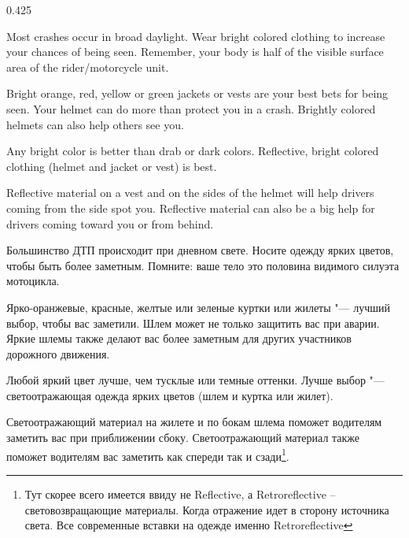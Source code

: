 \begin{langblock}{0.425}
	\begin{eng}
	
	Most crashes occur in broad daylight. Wear bright colored clothing to increase your chances of being seen. Remember, your body is half of the visible surface area of the rider/motorcycle unit.
	
	Bright orange, red, yellow or green jackets or vests are your best bets for being seen. Your helmet can do more than protect you in a crash.  Brightly colored helmets can also help others see you.
	
	Any bright color is better than drab or dark colors. Reflective, bright colored clothing (helmet and jacket or vest) is best.
	
	Reflective material on a vest and on the sides of the helmet will help drivers coming from the side spot you.  Reflective material can also be a big help for drivers coming toward you or from behind.
	\end{eng}
	\begin{rus}
		
		Большинство ДТП происходит при дневном свете. Носите одежду ярких цветов, чтобы быть более заметным. Помните: ваше тело это половина видимого силуэта мотоцикла.
		
		Ярко-оранжевые, красные, желтые или зеленые куртки или жилеты "--- лучший выбор, чтобы вас заметили. Шлем может не только защитить вас при аварии. Яркие шлемы также делают вас более заметным для других участников дорожного движения.
		
		Любой яркий цвет лучше, чем тусклые или темные оттенки. Лучше выбор "--- светоотражающая одежда ярких цветов (шлем и куртка или жилет).
		
		Светоотражающий материал на жилете и по бокам шлема поможет водителям заметить вас при приближении сбоку. Светоотражающий материал также поможет водителям вас заметить как спереди так и сзади\footnote{Тут скорее всего имеется ввиду не Reflective, а Retroreflective -- световозвращающие материалы. Когда отражение идет в сторону источника света. Все современные вставки на одежде именно Retroreflective}.
\end{rus}
\end{langblock}






